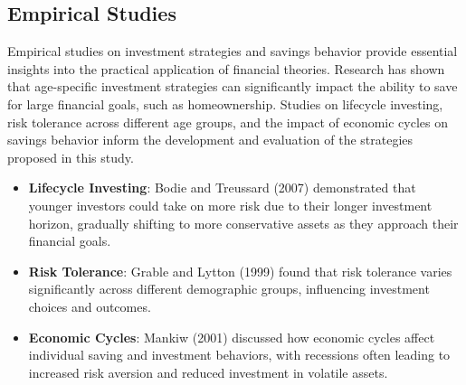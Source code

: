 \subsection{Empirical Studies}
Empirical studies on investment strategies and savings behavior provide essential insights into the practical application of financial theories. Research has shown that age-specific investment strategies can significantly impact the ability to save for large financial goals, such as homeownership. Studies on lifecycle investing, risk tolerance across different age groups, and the impact of economic cycles on savings behavior inform the development and evaluation of the strategies proposed in this study.

\begin{itemize}
    \item \textbf{Lifecycle Investing}: Bodie and Treussard (2007) demonstrated that younger investors could take on more risk due to their longer investment horizon, gradually shifting to more conservative assets as they approach their financial goals.
    \item \textbf{Risk Tolerance}: Grable and Lytton (1999) found that risk tolerance varies significantly across different demographic groups, influencing investment choices and outcomes.
    \item \textbf{Economic Cycles}: Mankiw (2001) discussed how economic cycles affect individual saving and investment behaviors, with recessions often leading to increased risk aversion and reduced investment in volatile assets.
\end{itemize}

